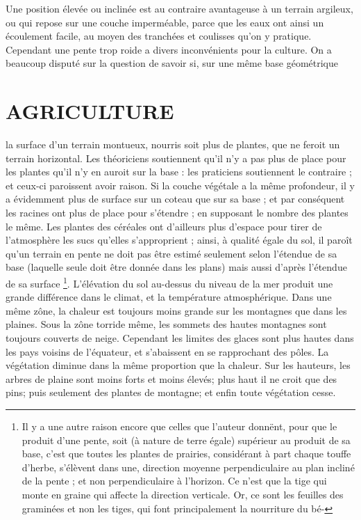 Une position élevée ou inclinée est au contraire avantageuse à un terrain argileux, ou qui repose sur une couche imperméable, parce que les eaux ont ainsi un écoulement facile, au moyen des tranchées et coulisses qu'on y pratique. Cependant une pente trop roide a divers inconvénients pour la culture.
On a beaucoup disputé sur la question de savoir si, sur une même base géométrique\setcounter{page}{188} \section{AGRICULTURE}
la surface d'un terrain montueux, nourris soit plus de plantes, que ne feroit un terrain horizontal. Les théoriciens soutiennent qu'il n'y a pas plus de place pour les plantes qu'il n'y en auroit sur la base : les praticiens soutiennent le contraire ; et ceux-ci paroissent avoir raison. Si la couche végétale a la même profondeur, il y a évidemment plus de surface sur un coteau que sur sa base ; et par conséquent les racines ont plus de place pour s'étendre ; en supposant le nombre des plantes le même. Les plantes des céréales ont d'ailleurs plus d'espace pour tirer de l'atmosphère les sucs qu'elles s'approprient ; ainsi, à qualité égale du sol, il paroît qu'un terrain en pente ne doit pas être estimé seulement selon l'étendue de sa base (laquelle seule doit être donnée dans les plans) mais aussi d'après l'étendue de sa surface \footnote{Il y a une autre raison encore que celles que l'auteur donnënt, pour que le produit d'une pente, soit (à nature de terre égale) supérieur au produit de sa base, c'est que toutes les plantes de prairies, considérant à part chaque touffe d'herbe, s'élèvent dans une, direction moyenne perpendiculaire au plan incliné de la pente ; et non perpendiculaire à l'horizon. Ce n'est que la tige qui monte en graine qui affecte la direction verticale. Or, ce sont les feuilles des graminées et non les tiges, qui font principalement la nourriture du bé-}.\setcounter{page}{189} L'élévation du sol au-dessus du niveau de la mer produit une grande différence dans le climat, et la température atmosphérique. Dans une même zône, la chaleur est toujours moins grande sur les montagnes que dans les plaines. Sous la zône torride même, les sommets des hautes montagnes sont toujours couverts de neige. Cependant les limites des glaces sont plus hautes dans les pays voisins de l'équateur, et s'abaissent en se rapprochant des pôles. La végétation diminue dans la même proportion que la chaleur. Sur les hauteurs, les arbres de plaine sont moins forts et moins élevés; plus haut il ne croit que des pins; puis seulement des plantes de montagne; et enfin toute végétation cesse.
